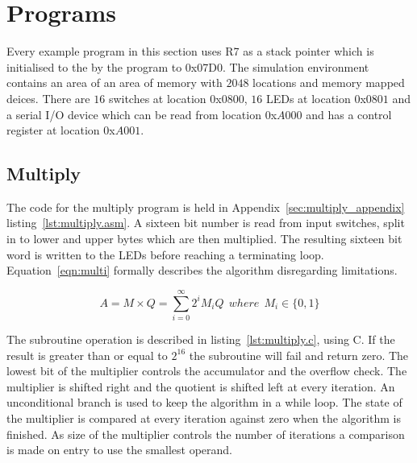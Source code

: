 

\section{Programs}
Every example program in this section uses R7 as a stack pointer which is initialised to the by the program to 0x07D0.%
The simulation environment contains an area of an area of memory with $2048$ locations and memory mapped deices.
There are $16$ switches at location $0$x$0800$, $16$ LEDs at location $0$x$0801$ and a serial I/O device which can be read from location $0$x$A000$ and has a control register at location $0$x$A001$. 




\subsection{Multiply}
\label{sec:multiply}
The code for the multiply program is held in Appendix~\ref{sec:multiply_appendix} listing~\ref{lst:multiply.asm}.
A sixteen bit number is read from input switches, split in to lower and upper bytes which are then multiplied.
The resulting sixteen bit word is written to the LEDs before reaching a terminating loop.
Equation~\eqref{eqn:multi} formally describes the algorithm disregarding limitations.

\begin{equation}
	A = M \times Q = \sum_{i=0}^{\infty} 2^i M_i Q\:\:where\:\:M_i \in \{0,1\}
   \label{eqn:multi}
\end{equation}



The subroutine operation is described in listing~\ref{lst:multiply.c}, using C. 
If the result is greater than or equal to $2^{16}$ the subroutine will fail and return zero.
The lowest bit of the multiplier controls the accumulator and the overflow check.
The multiplier is shifted right and the quotient is shifted left at every iteration.
An unconditional branch is used to keep the algorithm in a while loop. 
The state of the multiplier is compared at every iteration against zero when the algorithm is finished.
As size of the multiplier controls the number of iterations a comparison is made on entry to use the smallest operand.

\begin{minipage}{\linewidth}

\end{minipage}


